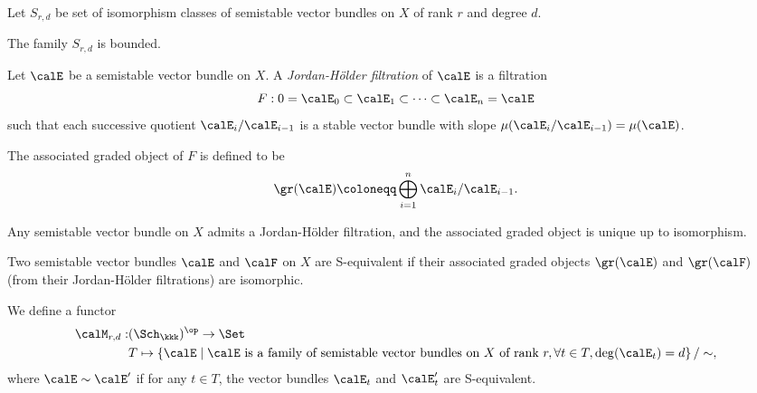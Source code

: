     Let \(S_{r,d}\) be set of isomorphism classes of semistable vector bundles on \(X\) of rank \(r\) and degree \(d\).

    \begin{proposition}\label{prop:semistable_vector_bundles_are_bounded}
        The family \(S_{r,d}\) is bounded.
    \end{proposition}


    \begin{definition}\label{def:Jordan-Holder_filtration}
        Let \(\calE\) be a semistable vector bundle on \(X\).
        A \emph{Jordan-H\"older filtration} of \(\calE\) is a filtration 
        \[ F : 0 = \calE_0 \subset \calE_1 \subset \cdots \subset \calE_n = \calE \]
        such that each successive quotient \(\calE_i/\calE_{i-1}\) is a stable vector bundle with slope \(\mu(\calE_i/\calE_{i-1}) = \mu(\calE)\).
        
        The associated graded object of \(F\) is defined to be 
        \[ \gr(\calE) \coloneqq \bigoplus_{i=1}^n \calE_i/\calE_{i-1}. \]
        
        Any semistable vector bundle on \(X\) admits a Jordan-H\"older filtration, and the associated graded object is unique up to isomorphism.
    \end{definition}

    \begin{definition}[S-equivalence]\label{def:S-equivalence}
        Two semistable vector bundles \(\calE\) and \(\calF\) on \(X\) are S-equivalent if their associated graded objects \(\gr(\calE)\) and \(\gr(\calF)\) (from their Jordan-H\"older filtrations) are isomorphic.
    \end{definition}


    \begin{definition}\label{def:coarse_moduli_functor_of_vector_bundles}
        We define a functor 
        \begin{align*}
            \calM_{r,d} : & (\Sch_\kkk)^{\op} \to \Set \\
            & T \mapsto \left\{ 
                \calE 
            \;\middle|\;
                \calE \text{ is a family of semistable vector bundles on } X \text{ of rank } r, \forall t \in T, \deg(\calE_t) = d
            \right\}/ \sim,
        \end{align*}
        where \(\calE \sim \calE'\) if for any \(t \in T\), the vector bundles \(\calE_t\) and \(\calE'_t\) are S-equivalent.
    \end{definition}